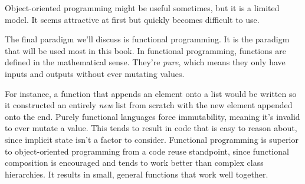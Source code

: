 \documentclass{book}
\begin{document}
Object{-}oriented programming might be useful sometimes, but it is a limited
model. It seems attractive at first but quickly becomes difficult to use.

The final paradigm we{'}ll discuss is functional programming. It is the
paradigm that will be used most in this book. In functional programming,
functions are defined in the mathematical sense. They{'}re \textit{pure},
which means they only have inputs and outputs without ever mutating
values.

For instance, a function that appends an element onto a list would be
written so it constructed an entirely \textit{new} list from scratch with
the new element appended onto the end. Purely functional languages force
immutability, meaning it{'}s invalid to ever mutate a value. This tends to
result in code that is easy to reason about, since implicit state isn{'}t
a factor to consider. Functional programming is superior to
object{-}oriented programming from a code reuse standpoint, since functional
composition is encouraged and tends to work better than complex class
hierarchies. It results in small, general functions that work well
together.
\end{document}
